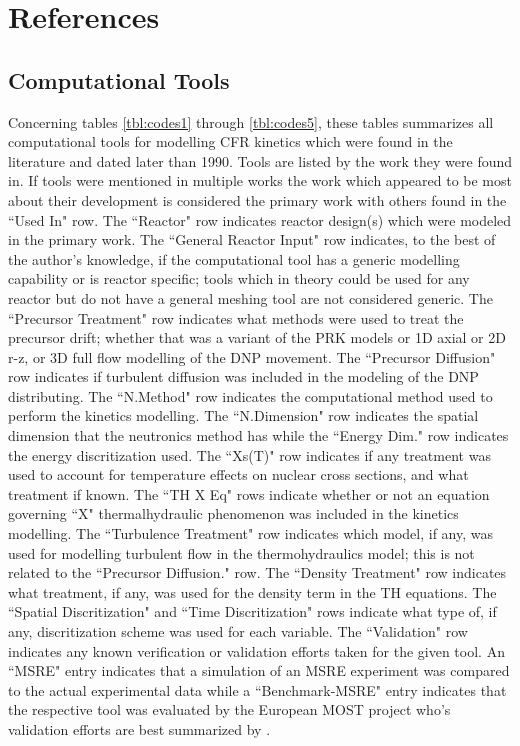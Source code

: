 \documentclass[review]{elsarticle}
\begin{document}
\section*{References}



\begin{appendices}

\section{Computational Tools} \label{app:tools}
Concerning tables \ref{tbl:codes1} through \ref{tbl:codes5}, these tables
 summarizes all computational
tools for modelling CFR kinetics which were
found in the literature and dated later than 1990. Tools are listed by the
work they were found in. If tools were mentioned in multiple works the
work which appeared to be most about their development is considered
the primary work with others found in the ``Used In" row. The
``Reactor" row indicates reactor design(s) which were modeled in
the primary work. The ``General Reactor Input" row indicates, to the best
of the author's knowledge, if the computational tool has a generic modelling
capability or is reactor specific; tools which in theory could be used for
any reactor but do not have a general meshing tool are not considered generic.
The ``Precursor Treatment" row indicates what methods were used to
treat the precursor drift; whether that was a variant of the PRK models
or 1D axial or 2D r-z, or 3D full flow modelling of the DNP movement.
The ``Precursor Diffusion" row indicates if turbulent diffusion was included in
the modeling of the DNP distributing.
The ``N.Method" row indicates the computational method used to perform the
kinetics modelling. The ``N.Dimension" row indicates the spatial dimension that
the neutronics method has while the ``Energy Dim." row indicates the energy
discritization used.
The ``Xs(T)" row indicates if any treatment was used to account for temperature
effects on nuclear cross sections, and what treatment if known. 
The ``TH X Eq" rows indicate whether or not an equation governing ``X" thermalhydraulic
phenomenon was
included in the kinetics modelling.
The ``Turbulence Treatment" row 
indicates which model, if any, was used for modelling turbulent flow in the
thermohydraulics model; this is not related to the ``Precursor Diffusion." row.
The ``Density Treatment" row indicates what treatment, if any, was used for the
density term in the TH equations. The ``Spatial Discritization" and ``Time
Discritization" rows indicate what type of, if any, discritization scheme was
used for each variable. The ``Validation" row indicates any known verification
or validation efforts taken for the given tool. An ``MSRE" entry indicates
that a simulation of an MSRE experiment was compared to the actual experimental
data while a ``Benchmark-MSRE" entry indicates that the respective tool was
evaluated by the European MOST project who's validation efforts are best
summarized by \cite{delpech_benchmark_2003}.


\end{appendices}
\end{document}
